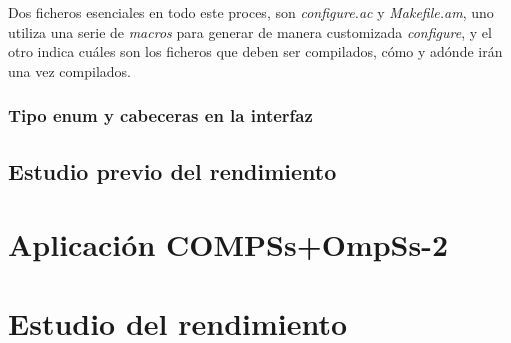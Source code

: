 Dos ficheros esenciales en todo este proces, son \textit{configure.ac} y \textit{Makefile.am}, uno utiliza una serie de \textit{macros}  para generar de manera customizada \textit{configure}, y el otro indica cuáles son los ficheros que deben ser compilados, cómo y adónde irán una vez compilados.
\par\bigskip



\subsubsection{Tipo enum y cabeceras en la interfaz}


\subsection{Estudio previo del rendimiento}
\section{Aplicación COMPSs+OmpSs-2}
\section{Estudio del rendimiento}

